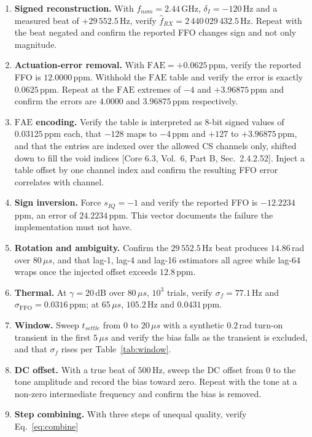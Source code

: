 \documentclass[11pt,a4paper]{article}
\newcommand{\us}{\,\ensuremath{\upmu}s}
\newcommand{\FFO}{\mathrm{FFO}}
\newcommand{\FAE}{\mathrm{FAE}}
\providecommand{\upmu}{\mu}
\newcommand{\core}[1]{\textcolor{rulegrey}{\small[Core 6.3, #1]}}
\begin{document}
\begin{enumerate}[label=\textbf{D\arabic*.},leftmargin=2.6em,itemsep=2pt]
  \item \textbf{Signed reconstruction.} With $f_{nom}=2.44$\,GHz, $\delta_I=-120$\,Hz and a measured
    beat of $+29\,552.5$\,Hz, verify $\widehat f_{RX} = 2\,440\,029\,432.5$\,Hz. Repeat with the beat
    negated and confirm the reported FFO changes sign and not only magnitude.
  \item \textbf{Actuation-error removal.} With $\FAE=+0.0625$\,ppm, verify the reported FFO is
    $12.0000$\,ppm. Withhold the $\FAE$ table and verify the error is exactly $0.0625$\,ppm. Repeat at
    the $\FAE$ extremes of $-4$ and $+3.96875$\,ppm and confirm the errors are $4.0000$ and
    $3.96875$\,ppm respectively.
  \item \textbf{$\FAE$ encoding.} Verify the table is interpreted as 8-bit signed values of
    $0.03125$\,ppm each, that $-128$ maps to $-4$\,ppm and $+127$ to $+3.96875$\,ppm, and that the
    entries are indexed over the allowed CS channels only, shifted down to fill the void indices
    \core{Vol.\ 6, Part B, Sec.\ 2.4.2.52}. Inject a table offset by one channel index and confirm the
    resulting FFO error correlates with channel.
  \item \textbf{Sign inversion.} Force $s_{IQ}=-1$ and verify the reported FFO is $-12.2234$\,ppm,
    an error of $24.2234$\,ppm. This vector documents the failure the implementation must not have.
  \item \textbf{Rotation and ambiguity.} Confirm the $29\,552.5$\,Hz beat produces $14.86$\,rad over
    $80\us$, and that lag-1, lag-4 and lag-16 estimators all agree while lag-64 wraps once the
    injected offset exceeds $12.8$\,ppm.
  \item \textbf{Thermal.} At $\gamma=20$\,dB over $80\us$, $10^3$ trials, verify
    $\sigma_f = 77.1$\,Hz and $\sigma_\FFO = 0.0316$\,ppm; at $65\us$, $105.2$\,Hz and
    $0.0431$\,ppm.
  \item \textbf{Window.} Sweep $t_{settle}$ from $0$ to $20\us$ with a synthetic $0.2$\,rad turn-on
    transient in the first $5\us$ and verify the bias falls as the transient is excluded, and that
    $\sigma_f$ rises per Table~\ref{tab:window}.
  \item \textbf{DC offset.} With a true beat of $500$\,Hz, sweep the DC offset from $0$ to the tone
    amplitude and record the bias toward zero. Repeat with the tone at a non-zero intermediate
    frequency and confirm the bias is removed.
  \item \textbf{Step combining.} With three steps of unequal quality, verify Eq.~\eqref{eq:combine}

\end{enumerate}
\end{document}
